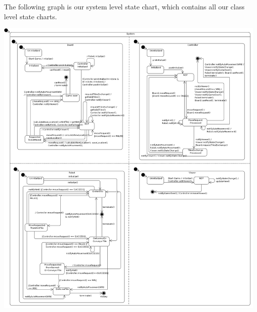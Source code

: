 The following graph is our system level state chart, which contains all our class level state charts.

\includegraphics[width=\linewidth]{statecharts/system.pdf}
